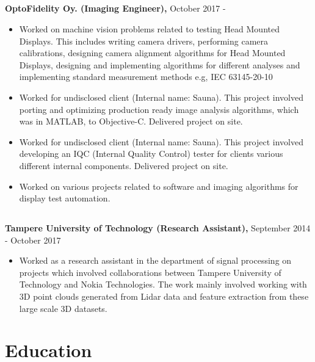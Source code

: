\documentclass{article}
\begin{document}
\subsection{}
\textbf{OptoFidelity Oy. (Imaging Engineer),} October 2017 -
\begin{itemize}[label={--}]
  \itemsep0em 

  \item Worked on machine vision problems related to testing Head Mounted
    Displays.  This includes writing camera drivers, performing camera
    calibrations, designing camera alignment algorithms for Head Mounted
    Displays, designing and implementing algorithms for different analyses and
    implementing standard measurement methods e.g, IEC 63145-20-10

  \item Worked for undisclosed client (Internal name: Sauna). This project
    involved porting and optimizing production ready image analysis algorithms,
    which was in MATLAB, to Objective-C. Delivered project on site.

  \item Worked for undisclosed client (Internal name: Sauna). This project
    involved developing an IQC (Internal Quality Control) tester for clients
    various different internal components.  Delivered project on site.

  \item Worked on various projects related to software and imaging algorithms
    for display test automation.

\end{itemize}

\subsection{}
\textbf{Tampere University of Technology (Research Assistant),} September 2014 -
  October 2017
\begin{itemize}[label={--}]
  \itemsep0em 

  \item Worked as a research assistant in the department of signal processing
    on projects which involved collaborations between Tampere University of
    Technology and Nokia Technologies.  The work mainly involved working with
    3D point clouds generated from Lidar data and feature extraction from these
    large scale 3D datasets.
\end{itemize}

\section{Education}
\end{document}

